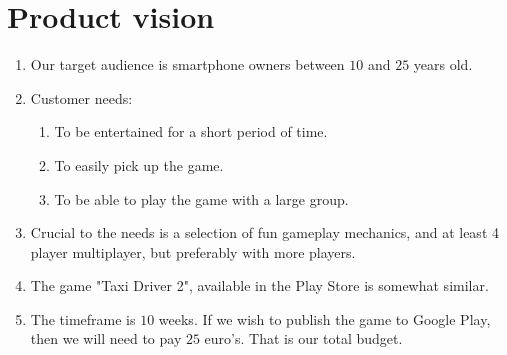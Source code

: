 \documentclass[11pt,twoside,a4paper]{article}
\begin{document}
\section*{Product vision}
\begin{enumerate}
\item Our target audience is smartphone owners between $10$ and $25$ years old.
\item Customer needs:
\begin{enumerate}
\item To be entertained for a short period of time.
\item To easily pick up the game.
\item To be able to play the game with a large group.
\end{enumerate}
\item Crucial to the needs is a selection of fun gameplay mechanics, and at least 4 player multiplayer, but preferably with more players.
\item The game "Taxi Driver 2", available in the Play Store is somewhat similar.
\item The timeframe is $10$ weeks. If we wish to publish the game to Google Play, then we will need to pay $25$ euro's. That is our total budget.
\end{enumerate}
\end{document}
